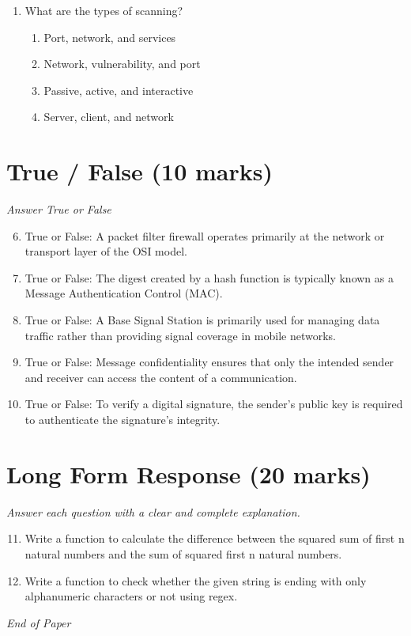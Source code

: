 \documentclass[12pt]{article}
\begin{document}
\begin{enumerate}[label=\arabic*.]
\begin{enumerate}[label=(\alph*)]
    \item AP-handshaking
    \item 4-way handshake
    \item 4-way connection
    \item wireless handshaking
\end{enumerate}
\item What are the types of scanning?
\begin{enumerate}[label=(\alph*)]
    \item Port, network, and services
    \item Network, vulnerability, and port
    \item Passive, active, and interactive
    \item Server, client, and network
\end{enumerate}
\end{enumerate}

\section*{True / False (10 marks)}
\textit{Answer True or False}
\begin{enumerate}[label=\arabic*.]
\setcounter{enumi}{5}
\item True or False: A packet filter firewall operates primarily at the network or transport layer of the OSI model.
\item True or False: The digest created by a hash function is typically known as a Message Authentication Control (MAC).
\item True or False: A Base Signal Station is primarily used for managing data traffic rather than providing signal coverage in mobile networks.
\item True or False: Message confidentiality ensures that only the intended sender and receiver can access the content of a communication.
\item True or False: To verify a digital signature, the sender's public key is required to authenticate the signature's integrity.
\end{enumerate}

\section*{Long Form Response (20 marks)}
\textit{Answer each question with a clear and complete explanation.}
\begin{enumerate}[label=\arabic*.]
\setcounter{enumi}{10}
\item Write a function to calculate the difference between the squared sum of first n natural numbers and the sum of squared first n natural numbers.
\item Write a function to check whether the given string is ending with only alphanumeric characters or not using regex.
\end{enumerate}

\vfill
\noindent\textit{End of Paper}
\end{document}
